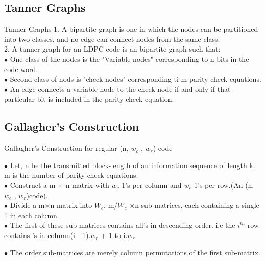 \subsection{Tanner Graphs}
\begin{frame}{Tanner Graphs}
1. A bipartite graph is one in which the nodes can be partitioned into two classes, and no edge can connect nodes from the same class.\\
2. A tanner graph for an LDPC code is an bipartite graph such that:\\
\;\;\;\;\; $\bullet$ One class of the nodes is the "Variable nodes" corresponding to n bits in the code word.\\
\;\;\;\;\; $\bullet$ Second class of nods is "check nodes" corresponding ti m parity check equations.\\
\;\;\;\;\; $\bullet$ An edge connects a variable node to the check node if and only if that particular bit is included in the parity check equation.
\end{frame}

\subsection{Gallagher's Construction}
\begin{frame}{Gallagher's Construction for regular (n, $w_c$ , $w_r$) code}

$\bullet$ Let, n be the transmitted block-length of an information sequence of length k. m is the number of parity check equations.\\
$\bullet$ Construct a m $\times$ n matrix with $w_c$ 1's per column and $w_r$ 1's per row.(An (n, $w_c$ , $w_r$)code).\\
$\bullet$ Divide a m$\times$n matrix into $W_c$, m/$W_c$ $\times$n sub-matrices, each containing a single 1 in each column.\\
$\bullet$ The first of these sub-matrices contains all's in descending order.  i.e the $i^{th}$ row contains  's in column(i - 1).$w_r$ + 1 to i.$w_r$.

$\bullet$  The order sub-matrices are merely column permutations of the first sub-matrix.

\end{frame}



